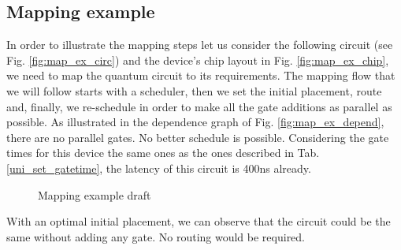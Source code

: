 \subsection*{Mapping example}
\label{sec:org4fefa41}
In order to illustrate the mapping steps let us consider the following circuit (see Fig. \ref{fig:map_ex_circ}) and the device's chip layout in Fig. \ref{fig:map_ex_chip}, we need to map the quantum circuit to its requirements.
The mapping flow that we will follow starts with a scheduler, then we set the initial placement, route and, finally, we re-schedule in order to make all the gate additions as parallel as possible.
As illustrated in the dependence graph of Fig. \ref{fig:map_ex_depend}, there are no parallel gates.
No better schedule is possible.
Considering the gate times for this device the same ones as the ones described in Tab. \ref{uni_set_gatetime}, the latency of this circuit is 400ns already.


\begin{figure}[H]
\centering
{}
\label{fig:map_ex_circ}

\label{fig:map_ex_depend}

\label{fig:map_ex_chip}

\label{fig:map_ex_def}
\caption{Mapping example draft}
\end{figure}
With an optimal initial placement, we can observe that the circuit could be the same without adding any gate.
No routing would be required.


